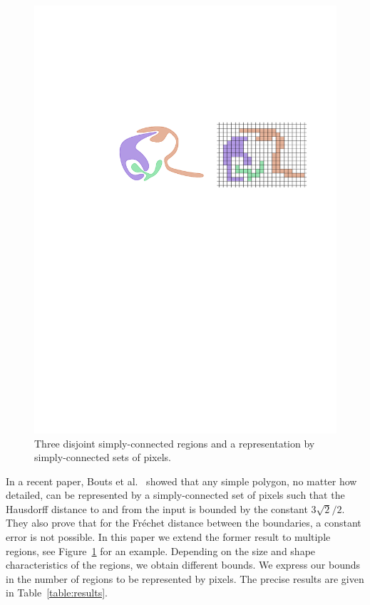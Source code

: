 \documentclass[a4paper, 11pt]{article}
\newcommand{\etal}{\textnormal{et al.}\xspace}
\begin{document}
\begin{figure}[htb]
\centering
\includegraphics[]{Figures/introfig}
\caption{Three disjoint simply-connected regions and a representation by simply-connected sets of pixels.}
\label{fig:intro}
\end{figure}

In a recent paper, Bouts \etal~\cite{bouts2016mapping} showed that any simple polygon, no matter how detailed, can be represented by a simply-connected set of pixels such that the Hausdorff distance to and from the input is bounded by the constant $3\sqrt{2}/2$. They also prove that for the Fr\'echet distance between the boundaries, a constant error is not possible.
In this paper we extend the former result to multiple regions, see Figure~\ref{fig:intro} for an example. Depending on the size and shape characteristics of the regions, we obtain different bounds. We express our bounds in the number of regions to be represented by pixels. The precise results are given in Table~\ref{table:results}.
\end{document}

